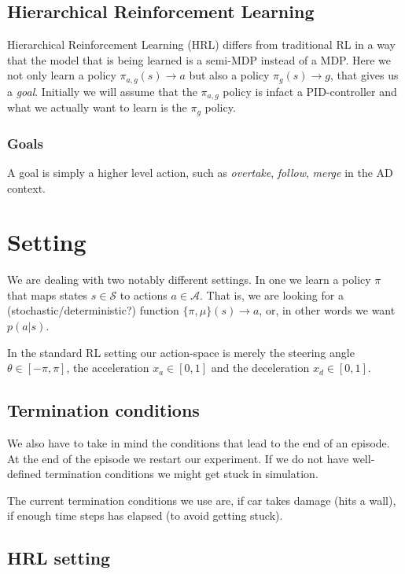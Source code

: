 \documentclass{article}
\begin{document}
\subsection{Hierarchical Reinforcement Learning}

Hierarchical Reinforcement Learning (HRL) differs from traditional RL in a way that the model that is being learned is a semi-MDP instead of a MDP. Here we not only learn a policy $\pi_{a,g}(s) \rightarrow a$ but also a policy $\pi_g(s) \rightarrow g$, that gives us a \textit{goal}. Initially we will assume that the $\pi_{a,g}$ policy is infact a PID-controller and what we actually want to learn is the $\pi_{g}$ policy.

\subsubsection{Goals}

A goal is simply a higher level action, such as \textit{overtake}, \textit{follow}, \textit{merge} in the AD context. 



\section{Setting}
We are dealing with two notably different settings. In one we learn a policy $\pi$ that maps states $s \in \mathcal{S}$ to actions $a \in \mathcal{A}$. That is, we are looking for a (stochastic/deterministic?) function $\{\pi,\mu\}(s) \rightarrow a$, or, in other words we want $p(a|s)$.

In the standard RL setting our action-space is merely the steering angle $\theta \in [-\pi,\pi]$, the acceleration $x_a \in [0,1]$ and the deceleration $x_d \in [0,1]$.

\subsection{Termination conditions}

We also have to take in mind the conditions that lead to the end of an episode. At the end of the episode we restart our experiment. If we do not have well-defined termination conditions we might get stuck in simulation.

The current termination conditions we use are, if car takes damage (hits a wall), if enough time steps has elapsed (to avoid getting stuck).

\subsection{HRL setting}
\end{document}
